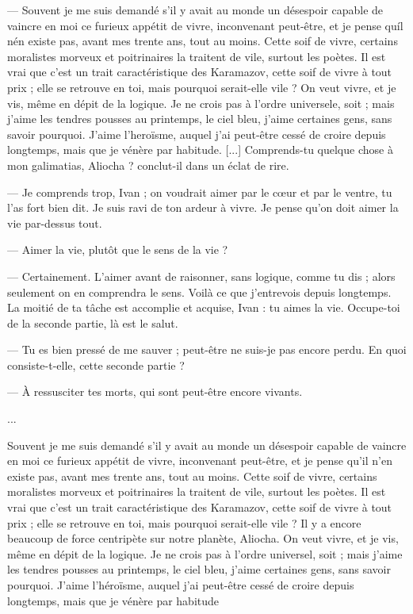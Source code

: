\documentclass[a4paper, 12pt]{article}
\begin{document}
--- Souvent je me suis demandé s'il y avait au monde un désespoir capable de vaincre
en moi ce furieux appétit de vivre, inconvenant peut-être, et je pense quíl nén
existe pas, avant mes trente ans, tout au moins. Cette soif de vivre, certains
moralistes morveux et poitrinaires la traitent de vile, surtout les poètes. Il
est vrai que c'est un trait caractéristique des Karamazov, cette soif de vivre à
tout prix ; elle se retrouve en toi, mais pourquoi serait-elle vile ? On veut
vivre, et je vis, même en dépit de la logique. Je ne crois pas à l'ordre
universele, soit ; mais j'aime les tendres pousses au printemps, le ciel bleu,
j'aime certaines gens, sans savoir pourquoi. J'aime l'heroïsme, auquel j'ai
peut-être cessé de croire depuis longtemps, mais que je vénère par habitude.
[...] Comprends-tu quelque chose à mon galimatias, Aliocha ? conclut-il dans un éclat de rire.

— Je comprends trop, Ivan ; on voudrait aimer par le cœur et par le ventre, tu
l’as fort bien dit. Je suis ravi de ton ardeur à vivre. Je pense qu’on doit
aimer la vie par-dessus tout.

— Aimer la vie, plutôt que le sens de la vie ?

— Certainement. 
L’aimer avant de raisonner, sans logique, comme tu dis ; alors seulement on en comprendra le sens. Voilà ce que j’entrevois depuis longtemps. La moitié de ta tâche est accomplie et acquise, Ivan : tu aimes la vie. Occupe-toi de la seconde partie, là est le salut.

— Tu es bien pressé de me sauver ; peut-être ne suis-je pas encore perdu. En
quoi consiste-t-elle, cette seconde partie ?

— À ressusciter tes morts, qui sont peut-être encore vivants. 

...

Souvent je me suis demandé s’il y avait au monde un désespoir capable de vaincre
en moi ce furieux appétit de vivre, inconvenant peut-être, et je pense qu’il
n’en existe pas, avant mes trente ans, tout au moins. Cette soif de vivre,
certains moralistes morveux et poitrinaires la traitent de vile, surtout les
poètes. Il est vrai que c’est un trait caractéristique des Karamazov, cette soif
de vivre à tout prix ; elle se retrouve en toi, mais pourquoi serait-elle vile ?
Il y a encore beaucoup de force centripète sur notre planète, Aliocha. On veut
vivre, et je vis, même en dépit de la logique. Je ne crois pas à l’ordre
universel, soit ; mais j’aime les tendres pousses au printemps, le ciel bleu,
j’aime certaines gens, sans savoir pourquoi. J’aime l’héroïsme, auquel j’ai
peut-être cessé de croire depuis longtemps, mais que je vénère par habitude
\end{document}
